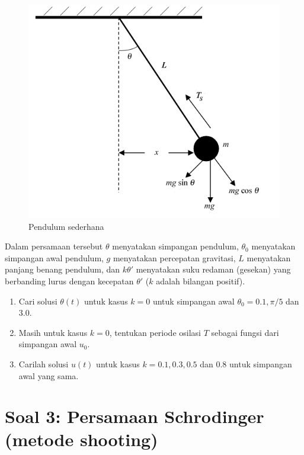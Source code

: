\documentclass[12pt,bahasa]{article}
\begin{document}
\begin{figure}[H]
\centering
\includegraphics[scale=0.5]{images/pendulum.png}
\par
\caption{Pendulum sederhana}
\end{figure}

Dalam persamaan tersebut $\theta$ menyatakan simpangan pendulum,
$\theta_0$ menyatakan simpangan awal pendulum,
$g$ menyatakan percepatan gravitasi, $L$ menyatakan panjang benang pendulum,
dan $k\theta'$ menyatakan suku redaman (gesekan) yang berbanding lurus
dengan kecepatan $\theta'$ ($k$ adalah bilangan positif).

\begin{enumerate}[label=(\alph*)]
\item Cari solusi $\theta(t)$ untuk kasus $k=0$ untuk simpangan awal $\theta_0 = 0.1, \pi/5$
dan 3.0.
\item Masih untuk kasus $k=0$, tentukan periode osilasi $T$ sebagai
fungsi dari simpangan awal $u_0$.
\item Carilah solusi $u(t)$ untuk kasus $k = 0.1, 0.3, 0.5$ dan 0.8 untuk
simpangan awal yang sama.
\end{enumerate}


\section{Soal 3: Persamaan Schrodinger (metode shooting)}
\end{document}
